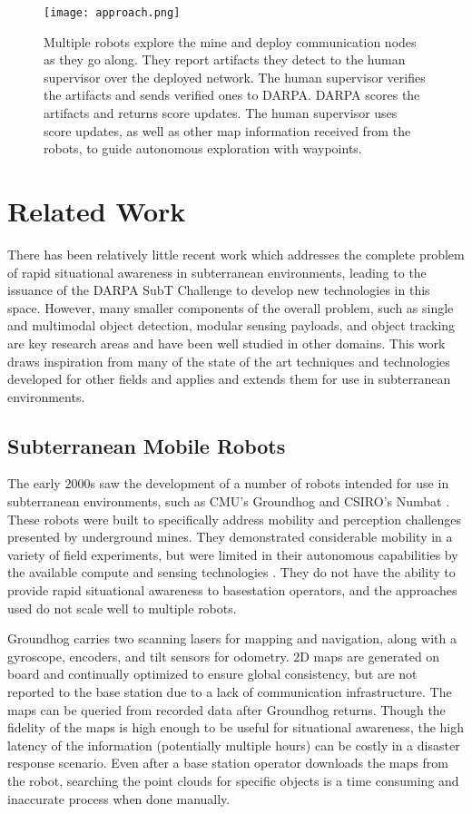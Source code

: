 \begin{figure}	
	\centering
	\texttt{[image: approach.png]}
	\caption[Our approach]{Multiple robots explore the mine and deploy communication nodes as they go along. They report artifacts they detect to the human supervisor over the deployed network. The human supervisor verifies the artifacts and sends verified ones to DARPA. DARPA scores the artifacts and returns score updates. The human supervisor uses score updates, as well as other map information received from the robots, to guide autonomous exploration with waypoints.}
	\label{approach}
\end{figure}

\section{Related Work}

There has been relatively little recent work which addresses the complete problem of rapid situational awareness in subterranean environments, leading to the issuance of the DARPA SubT Challenge to develop new technologies in this space. However, many smaller components of the overall problem, such as single and multimodal object detection, modular sensing payloads, and object tracking are key research areas and have been well studied in other domains. This work draws inspiration from many of the state of the art techniques and technologies developed for other fields and applies and extends them for use in subterranean environments.

\subsection{Subterranean Mobile Robots}

The early 2000s saw the development of a number of robots intended for use in subterranean environments, such as CMU's Groundhog \cite{ferguson2004autonomous} and CSIRO's Numbat \cite{ralston1998numbat}. These robots were built to specifically address mobility and perception challenges presented by underground mines. They demonstrated considerable mobility in a variety of field experiments, but were limited in their autonomous capabilities by the available compute and sensing technologies \cite{morris2006recent}. They do not have the ability to provide rapid situational awareness to basestation operators, and the approaches used do not scale well to multiple robots.

Groundhog carries two scanning lasers for mapping and navigation, along with a gyroscope, encoders, and tilt sensors for odometry. 2D maps are generated on board and continually optimized to ensure global consistency, but are not reported to the base station due to a lack of communication infrastructure. The maps can be queried from recorded data after Groundhog returns. Though the fidelity of the maps is high enough to be useful for situational awareness, the high latency of the information (potentially multiple hours) can be costly in a disaster response scenario. Even after a base station operator downloads the maps from the robot, searching the point clouds for specific objects is a time consuming and inaccurate process when done manually.

